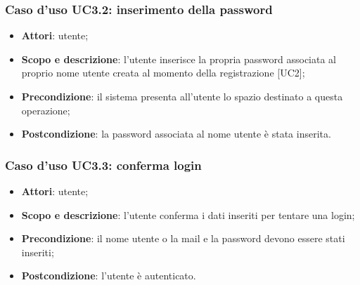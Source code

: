 \subsubsection{Caso d'uso UC3.2: inserimento della password}
\begin{itemize}
	\item \textbf{Attori}: utente;
	\item \textbf{Scopo e descrizione}: l'utente inserisce la propria password associata al proprio nome utente creata al momento della registrazione [UC2];
	\item \textbf{Precondizione}: il sistema presenta all'utente lo spazio destinato a questa operazione;
	\item \textbf{Postcondizione}: la password associata al nome utente è stata inserita.
\end{itemize}
\subsubsection{Caso d'uso UC3.3: conferma login}
\begin{itemize}
	\item \textbf{Attori}: utente;
	\item \textbf{Scopo e descrizione}: l'utente conferma i dati inseriti per tentare una login;
	\item \textbf{Precondizione}: il nome utente o la mail e la password devono essere stati inseriti;
	\item \textbf{Postcondizione}: l'utente è autenticato.
\end{itemize}